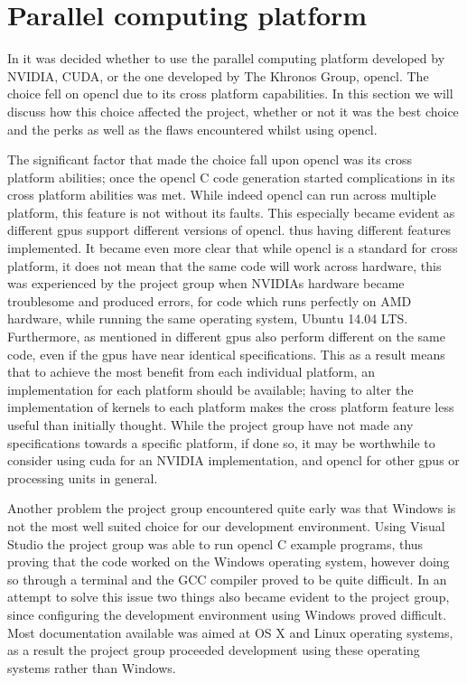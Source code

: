 \section{Parallel computing platform}
In  it was decided whether to use the parallel computing platform developed by NVIDIA, CUDA, or the one developed by The Khronos Group, \gls{opencl}.
The choice fell on \gls{opencl} due to its cross platform capabilities.
In this section we will discuss how this choice affected the project, whether or not it was the best choice and the perks as well as the flaws encountered whilst using \gls{opencl}.

The significant factor that made the choice fall upon \gls{opencl} was its cross platform abilities; once the \gls{opencl} C code generation started complications in its cross platform abilities was met.
While indeed \gls{opencl} can run across multiple platform, this feature is not without its faults.
This especially became evident as different \acrshort{gpu}s support different versions of \gls{opencl}. thus having different features implemented.
It became even more clear that while \gls{opencl} is a standard for cross platform, it does not mean that the same code will work across hardware, this was experienced by the project group when NVIDIAs hardware became troublesome and produced errors, for code which runs perfectly on AMD hardware, while running the same operating system, Ubuntu 14.04 LTS.
Furthermore, as mentioned in  different \acrshort{gpu}s also perform different on the same code, even if the \acrshort{gpu}s have near identical specifications.
This as a result means that to achieve the most benefit from each individual platform, an implementation for each platform should be available; having to alter the implementation of kernels to each platform makes the cross platform feature less useful than initially thought.
While the project group have not made any specifications towards a specific platform, if done so, it may be worthwhile to consider using \gls{cuda} for an NVIDIA implementation, and \gls{opencl} for other \acrshort{gpu}s or processing units in general.

Another problem the project group encountered quite early was that Windows is not the most well suited choice for our development environment.
Using Visual Studio the project group was able to run \gls{opencl} C example programs, thus proving that the code worked on the Windows operating system, however doing so through a terminal and the GCC compiler proved to be quite difficult. 
In an attempt to solve this issue two things also became evident to the project group, since configuring the development environment using Windows proved difficult.
Most documentation available was aimed at OS X and Linux operating systems, as a result the project group proceeded development using these operating systems rather than Windows.

